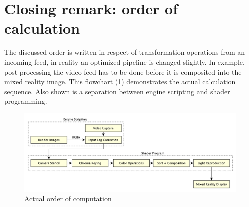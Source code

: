 %
\section{Closing remark: order of calculation}

The discussed order is written in respect of transformation operations from an 
incoming feed, in reality an optimized pipeline is changed slightly. In 
example, post processing the video feed has to be done before it is composited 
into the mixed reality image. This flowchart (\ref{fig:steps:order:alt}) 
demonstrates the actual calculation sequence. Also shown is a separation 
between engine scripting and shader programming.

\begin{figure}[htb]
	\includegraphics[width=\textwidth]{_raw_resources/pipeline_steps/4_9_order_alt.pdf}
	\caption{Actual order of computation}
	\label{fig:steps:order:alt}
\end{figure}

